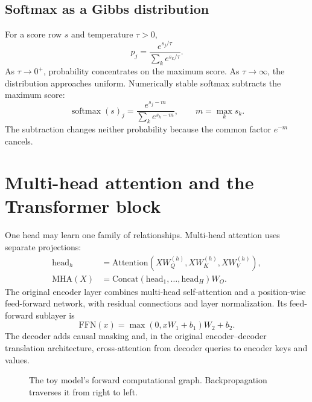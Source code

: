 \documentclass[11pt]{article}
\newcommand{\softmax}{\operatorname{softmax}}
\begin{document}
\subsection{Softmax as a Gibbs distribution}

For a score row $s$ and temperature $\tau>0$,
\[
  p_j=\frac{e^{s_j/\tau}}{\sum_k e^{s_k/\tau}}.
\]
As $\tau\to0^+$, probability concentrates on the maximum score. As $\tau\to\infty$, the distribution
approaches uniform. Numerically stable softmax subtracts the maximum score:
\[
  \softmax(s)_j=\frac{e^{s_j-m}}{\sum_k e^{s_k-m}},\qquad m=\max_k s_k.
\]
The subtraction changes neither probability because the common factor $e^{-m}$ cancels.

\section{Multi-head attention and the Transformer block}

One head may learn one family of relationships. Multi-head attention uses separate projections:
\begin{align}
  \mathrm{head}_h&=\mathrm{Attention}(XW_Q^{(h)},XW_K^{(h)},XW_V^{(h)}),\\
  \mathrm{MHA}(X)&=\mathrm{Concat}(\mathrm{head}_1,\ldots,\mathrm{head}_H)W_O.
\end{align}
The original encoder layer combines multi-head self-attention and a position-wise feed-forward network,
with residual connections and layer normalization. Its feed-forward sublayer is
\[
  \mathrm{FFN}(x)=\max(0,xW_1+b_1)W_2+b_2.
\]
The decoder adds causal masking and, in the original encoder--decoder translation architecture, cross-attention
from decoder queries to encoder keys and values.

\begin{figure}[ht]
\centering
{}
\caption{The toy model's forward computational graph. Backpropagation traverses it from right to left.}
\end{figure}
\end{document}
